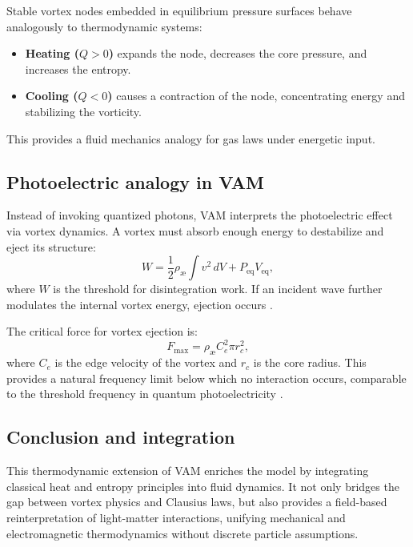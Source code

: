 Stable vortex nodes embedded in equilibrium pressure surfaces behave analogously to thermodynamic systems:
\begin{itemize}
    \item \textbf{Heating ($Q > 0$)} expands the node, decreases the core pressure, and increases the entropy. \item \textbf{Cooling ($Q < 0$)} causes a contraction of the node, concentrating energy and stabilizing the vorticity.
\end{itemize}
This provides a fluid mechanics analogy for gas laws under energetic input.

\subsection{Photoelectric analogy in VAM}

Instead of invoking quantized photons, VAM interprets the photoelectric effect via vortex dynamics. A vortex must absorb enough energy to destabilize and eject its structure:
\begin{equation}
    W = \frac{1}{2} \rho_{\text{\ae}} \int v^2 \, dV + P_{\text{eq}} V_{\text{eq}},\label{eq:photoelectric_work}
\end{equation}
where $W$ is the threshold for disintegration work. If an incident wave further modulates the internal vortex energy, ejection occurs \cite{vam2025unified}.

The critical force for vortex ejection is:
\begin{equation}
    F_{\max} = \rho_{\text{\ae}} C_e^2 \pi r_c^2,\label{eq:critical_force}
\end{equation}
where $C_e$ is the edge velocity of the vortex and $r_c$ is the core radius. This provides a natural frequency limit below which no interaction occurs, comparable to the threshold frequency in quantum photoelectricity \cite{einstein1905photoelectric}.

\subsection*{Conclusion and integration}

This thermodynamic extension of VAM enriches the model by integrating classical heat and entropy principles into fluid dynamics. It not only bridges the gap between vortex physics and Clausius laws, but also provides a field-based reinterpretation of light-matter interactions, unifying mechanical and electromagnetic thermodynamics without discrete particle assumptions.